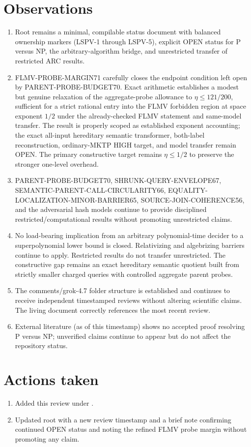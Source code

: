 \documentclass[11pt]{article}
\begin{document}
\section{Observations}
\begin{enumerate}
\item Root  remains a minimal, compilable status document with balanced ownership markers (LSPV-1 through LSPV-5), explicit OPEN status for P versus NP, the arbitrary-algorithm bridge, and unrestricted transfer of restricted ARC results.
\item FLMV-PROBE-MARGIN71 carefully closes the endpoint condition left open by PARENT-PROBE-BUDGET70. Exact arithmetic establishes a modest but genuine relaxation of the aggregate-probe allowance to $\eta\le 121/200$, sufficient for a strict rational entry into the FLMV forbidden region at space exponent $1/2$ under the already-checked FLMV statement and same-model transfer. The result is properly scoped as established exponent accounting; the exact all-input hereditary semantic transformer, both-label reconstruction, ordinary-MKTP HIGH target, and model transfer remain OPEN. The primary constructive target remains $\eta\le 1/2$ to preserve the stronger one-level overhead.
\item PARENT-PROBE-BUDGET70, SHRUNK-QUERY-ENVELOPE67, SEMANTIC-PARENT-CALL-CIRCULARITY66, EQUALITY-LOCALIZATION-MINOR-BARRIER65, SOURCE-JOIN-COHERENCE56, and the adversarial hash models continue to provide disciplined restricted/computational results without promoting unrestricted claims.
\item No load-bearing implication from an arbitrary polynomial-time decider to a superpolynomial lower bound is closed. Relativizing and algebrizing barriers continue to apply. Restricted results do not transfer unrestricted. The constructive gap remains an exact hereditary semantic quotient built from strictly smaller charged queries with controlled aggregate parent probes.
\item The comments/grok-4.7 folder structure is established and continues to receive independent timestamped reviews without altering scientific claims. The living document correctly references the most recent review.
\item External literature (as of this timestamp) shows no accepted proof resolving P versus NP; unverified claims continue to appear but do not affect the repository status.
\end{enumerate}

\section{Actions taken}
\begin{enumerate}
\item Added this review under .
\item Updated root  with a new review timestamp and a brief note confirming continued OPEN status and noting the refined FLMV probe margin without promoting any claim.
\end{enumerate}
\end{document}

